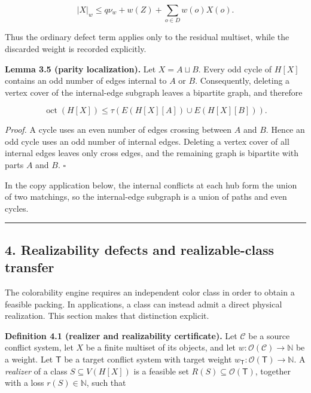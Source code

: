 \documentclass[english,11pt,a4paper]{article}
\begin{document}
\[
 |X|_w\le q\nu_w+w(Z)+\sum_{o\in D}w(o)X(o).
\]

Thus the ordinary defect term applies only to the residual multiset,
while the discarded weight is recorded explicitly.

\textbf{Lemma 3.5 (parity localization).} Let \(X=A\sqcup B\). Every odd
cycle of \(H[X]\) contains an odd number of edges internal to \(A\) or
\(B\). Consequently, deleting a vertex cover of the internal-edge
subgraph leaves a bipartite graph, and therefore

\[
\operatorname{oct}(H[X])
\le
\tau\!\left(E(H[X][A])\cup E(H[X][B])\right).
\]

\emph{Proof.} A cycle uses an even number of edges crossing between
\(A\) and \(B\). Hence an odd cycle uses an odd number of internal
edges. Deleting a vertex cover of all internal edges leaves only cross
edges, and the remaining graph is bipartite with parts \(A\) and \(B\).
\(\square\)

In the copy application below, the internal conflicts at each hub form
the union of two matchings, so the internal-edge subgraph is a union of
paths and even cycles.

\begin{center}\rule{0.5\linewidth}{0.5pt}\end{center}

\subsection{4. Realizability defects and realizable-class
transfer}\label{realizability-defects-and-realizable-class-transfer}

The colorability engine requires an independent color class in order to
obtain a feasible packing. In applications, a class can instead admit a
direct physical realization. This section makes that distinction
explicit.

\textbf{Definition 4.1 (realizer and realizability certificate).} Let
\(\mathcal C\) be a source conflict system, let \(X\) be a finite
multiset of its objects, and let
\(w:\mathcal O(\mathcal C)\to\mathbb N\) be a weight. Let \(\mathsf T\)
be a target conflict system with target weight
\(w_{\mathsf T}:\mathcal O(\mathsf T)\to\mathbb N\). A \emph{realizer}
of a class \(S\subseteq V(H[X])\) is a feasible set
\(R(S)\subseteq\mathcal O(\mathsf T)\), together with a loss
\(r(S)\in\mathbb N\), such that
\end{document}
